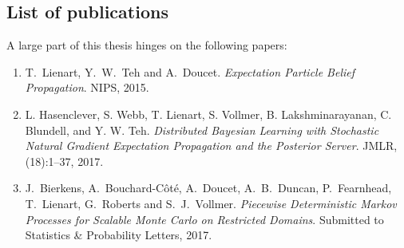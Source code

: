 \subsection*{List of publications}
A large part of this thesis hinges on the following papers:
\begin{enumerate}
	\item T.\ Lienart, Y.\ W.\ Teh and A.\ Doucet. \emph{Expectation Particle Belief Propagation}. NIPS, 2015. 
	\item L. Hasenclever, S. Webb, T. Lienart, S. Vollmer, B. Lakshminarayanan, C. Blundell, and Y. W. Teh. \emph{Distributed Bayesian Learning with Stochastic Natural Gradient Expectation Propagation and the Posterior Server}. JMLR, (18):1--37, 2017.
	\item J.\ Bierkens, A.\ Bouchard-C\^ot\'e, A.\ Doucet, A.\ B.\ Duncan, P.\ Fearnhead, T.\ Lienart, G.\ Roberts and S.\ J.\ Vollmer. \emph{Piecewise Deterministic Markov Processes for Scalable Monte Carlo on Restricted Domains}. Submitted to Statistics \& Probability Letters, 2017.
\end{enumerate}


\newpage
